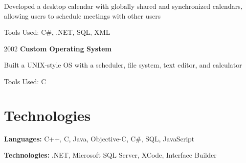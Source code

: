 \documentclass{resume}
\begin{document}
        \vspace{0.10 cm}
        \begin{onecolentry}
            \begin{highlights}
                \item Developed a desktop calendar with globally shared and synchronized calendars, allowing users to schedule meetings with other users
                \item Tools Used: C\#, .NET, SQL, XML
            \end{highlights}
        \end{onecolentry}


        \vspace{0.2 cm}

        \begin{twocolentry}{
            2002
        }
            \textbf{Custom Operating System}\end{twocolentry}

        \vspace{0.10 cm}
        \begin{onecolentry}
            \begin{highlights}
                \item Built a UNIX-style OS with a scheduler, file system, text editor, and calculator
                \item Tools Used: C
            \end{highlights}
        \end{onecolentry}



    
    \section{Technologies}



        
        \begin{onecolentry}
            \textbf{Languages:} C++, C, Java, Objective-C, C\#, SQL, JavaScript
        \end{onecolentry}

        \vspace{0.2 cm}

        \begin{onecolentry}
            \textbf{Technologies:} .NET, Microsoft SQL Server, XCode, Interface Builder
        \end{onecolentry}


    
\end{document}
